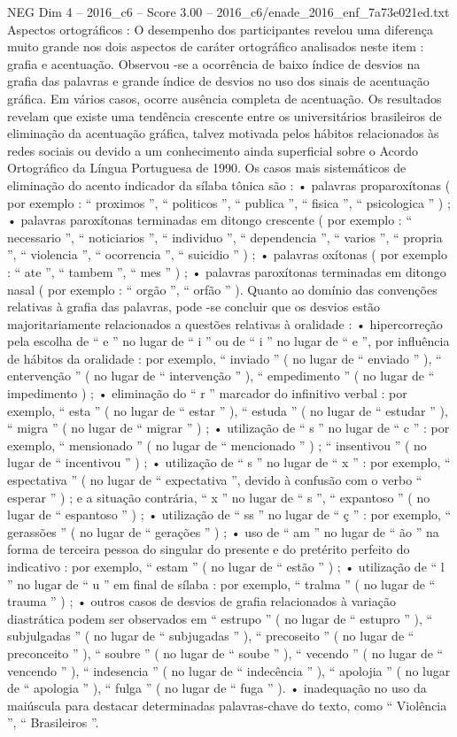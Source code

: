 \begin{textsample}{NEG Dim 4 – 2016\_c6 – Score 3.00 – 2016\_c6/enade\_2016\_enf\_7a73e021ed.txt}
Aspectos ortográficos : O desempenho dos participantes revelou uma diferença muito grande nos dois aspectos de caráter ortográfico analisados neste item : grafia e acentuação.
Observou -se a ocorrência de baixo índice de desvios na grafia das palavras e grande índice de desvios no uso dos sinais de acentuação gráfica.
Em vários casos, ocorre ausência completa de acentuação.
Os resultados revelam que existe uma tendência crescente entre os universitários brasileiros de eliminação da acentuação gráfica, talvez motivada pelos hábitos relacionados às redes sociais ou devido a um conhecimento ainda superficial sobre o Acordo Ortográfico da Língua Portuguesa de 1990.
Os casos mais sistemáticos de eliminação do acento indicador da sílaba tônica são : • palavras proparoxítonas ( por exemplo : “ proximos ”, “ politicos ”, “ publica ”, “ fisica ”, “ psicologica ” ) ; • palavras paroxítonas terminadas em ditongo crescente ( por exemplo : “ necessario ”, “ noticiarios ”, “ individuo ”, “ dependencia ”, “ varios ”, “ propria ”, “ violencia ”, “ ocorrencia ”, “ suicidio ” ) ; • palavras oxítonas ( por exemplo : “ ate ”, “ tambem ”, “ mes ” ) ; • palavras paroxítonas terminadas em ditongo nasal ( por exemplo : “ orgão ”, “ orfão ” ).
Quanto ao domínio das convenções relativas à grafia das palavras, pode -se concluir que os desvios estão majoritariamente relacionados a questões relativas à oralidade : • hipercorreção pela escolha de “ e ” no lugar de “ i ” ou de “ i ” no lugar de “ e ”, por influência de hábitos da oralidade : por exemplo, “ inviado ” ( no lugar de “ enviado ” ), “ entervenção ” ( no lugar de “ intervenção ” ), “ empedimento ” ( no lugar de “ impedimento ) ; • eliminação do “ r ” marcador do infinitivo verbal : por exemplo, “ esta ” ( no lugar de “ estar ” ), “ estuda ” ( no lugar de “ estudar ” ), “ migra ” ( no lugar de “ migrar ” ) ; • utilização de “ s ” no lugar de “ c ” : por exemplo, “ mensionado ” ( no lugar de “ mencionado ” ) ; “ insentivou ” ( no lugar de “ incentivou ” ) ; • utilização de “ s ” no lugar de “ x ” : por exemplo, “ espectativa ” ( no lugar de “ expectativa ”, devido à confusão com o verbo “ esperar ” ) ; e a situação contrária, “ x ” no lugar de “ s ”, “ expantoso ” ( no lugar de “ espantoso ” ) ; • utilização de “ ss ” no lugar de “ ç ” : por exemplo, “ gerassões ” ( no lugar de “ gerações ” ) ; • uso de “ am ” no lugar de “ ão ” na forma de terceira pessoa do singular do presente e do pretérito perfeito do indicativo : por exemplo, “ estam ” ( no lugar de “ estão ” ) ; • utilização de “ l ” no lugar de “ u ” em final de sílaba : por exemplo, “ tralma ” ( no lugar de “ trauma ” ) ; • outros casos de desvios de grafia relacionados à variação diastrática podem ser observados em “ estrupo ” ( no lugar de “ estupro ” ), “ subjulgadas ” ( no lugar de “ subjugadas ” ), “ precoseito ” ( no lugar de “ preconceito ” ), “ soubre ” ( no lugar de “ soube ” ), “ vecendo ” ( no lugar de “ vencendo ” ), “ indesencia ” ( no lugar de “ indecência ” ), “ apolojia ” ( no lugar de “ apologia ” ), “ fulga ” ( no lugar de “ fuga ” ). • inadequação no uso da maiúscula para destacar determinadas palavras-chave do texto, como “ Violência ”, “ Brasileiros ”.

\end{textsample}
